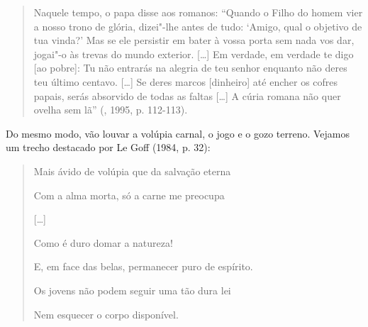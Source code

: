 \begin{quote}
Naquele tempo, o papa disse aos romanos: ``Quando o Filho do homem vier
a nosso trono de glória, dizei"-lhe antes de tudo: `Amigo, qual o
objetivo de tua vinda?' Mas se ele persistir em bater à vossa porta sem
nada vos dar, jogai"-o às trevas do mundo exterior. [\ldots{}] Em
verdade, em verdade te digo [ao pobre]: Tu não entrarás na alegria
de teu senhor enquanto não deres teu último centavo. [\ldots{}] Se
deres marcos [dinheiro] até encher os cofres papais, serás absorvido
de todas as faltas [\ldots{}] A cúria romana não quer ovelha sem
lã'' (, 1995, p. 112-113).
\end{quote}

Do mesmo modo, vão louvar a volúpia carnal, o jogo e o gozo terreno.
Vejamos um trecho destacado por Le Goff (1984, p. 32):

\begin{quote}
\forceindent{}Mais ávido de volúpia que da salvação eterna

Com a alma morta, só a carne me preocupa

[\ldots{}]

Como é duro domar a natureza!

E, em face das belas, permanecer puro de espírito.

Os jovens não podem seguir uma tão dura lei

Nem esquecer o corpo disponível.
\end{quote}

